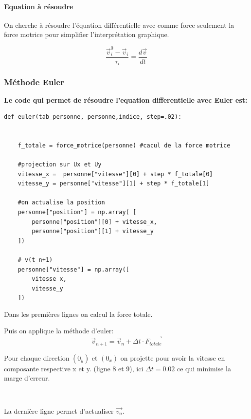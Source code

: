\documentclass[a4paper,12pt]{article}
\begin{document}
\paragraph{Equation à résoudre}

On cherche à résoudre l'équation différentielle avec comme force seulement la force motrice pour simplifier l'interprétation graphique.

\begin{equation}
\frac{\vec{v}_i^0 - \vec{v}_i}{\tau_i} = \frac{d\vec{v}}{dt}
\end{equation}

\subsubsection{Méthode Euler}


\textbf{Le code qui permet de résoudre l'equation differentielle avec Euler est:}

\begin{verbatim}
def euler(tab_personne, personne,indice, step=.02):

    
    f_totale = force_motrice(personne) #cacul de la force motrice

    #projection sur Ux et Uy
    vitesse_x =  personne["vitesse"][0] + step * f_totale[0]
    vitesse_y = personne["vitesse"][1] + step * f_totale[1]
    
    #on actualise la position
    personne["position"] = np.array( [
        personne["position"][0] + vitesse_x,
        personne["position"][1] + vitesse_y 
    ])

    # v(t_n+1)
    personne["vitesse"] = np.array([
        vitesse_x,
        vitesse_y
    ])
\end{verbatim}

\noindent Dans les premières lignes on calcul la force totale.

\noindent Puis on applique la méthode d'euler:
\begin{equation}
    \vec{v}_{n+1} = \vec{v}_n + \Delta t \cdot \vec{F_{totale}}
\end{equation}

\noindent Pour chaque direction $(0_y)$ et $(0_x)$ on projette pour avoir la vitesse en composante respective x et y. (ligne 8 et 9), ici $\Delta t = 0.02$ ce qui minimise la marge d'erreur.

\

\noindent La dernière ligne permet d'actualiser $\vec{v_n}$.
\end{document}
